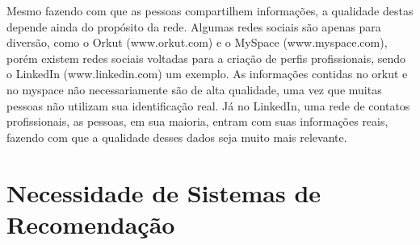 Mesmo fazendo com que as pessoas compartilhem informações, a qualidade destas depende ainda do propósito da rede. Algumas redes sociais são apenas para diversão, como o Orkut (www.orkut.com) e o MySpace (www.myspace.com), porém existem redes sociais voltadas para a criação de perfis profissionais, sendo o LinkedIn (www.linkedin.com) um exemplo. As informações contidas no orkut e no myspace não necessariamente são de alta qualidade, uma vez que muitas pessoas não utilizam sua identificação real. Já no LinkedIn, uma rede de contatos profissionais, as pessoas, em sua maioria, entram com suas informações reais, fazendo com que a qualidade desses dados seja muito mais relevante.

\section{Necessidade de Sistemas de Recomendação}




